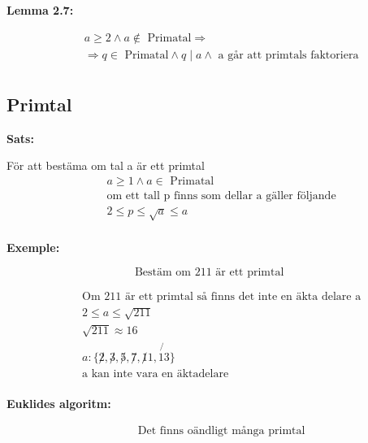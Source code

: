 \documentclass{article}
\begin{document}
\textbf{Lemma 2.7:}\par
\begin{align*}
  &\quad  a \geq 2 \land a \notin \text{ Primatal} \Rightarrow \\
  &\quad  \Rightarrow q \in \text{ Primatal} \land q \mid a \land \text{ a går att primtals faktoriera}\\
\end{align*}


\newpage

\subsection{Primtal}

\textbf{Sats:}\par
För att bestäma om tal a är ett primtal
\begin{align*}
  &\quad  a \geq 1 \land a \in \text{ Primatal} \\
  &\quad  \text{om ett tall p finns som dellar a gäller följande} \\
  &\quad  2 \leq p \leq \sqrt{a} \leq a \\
\end{align*}


\textbf{Exemple:}\par
\begin{equation}
  \text{Bestäm om 211 är ett primtal }
\end{equation}

\begin{align*}
  &\quad  \text{Om 211 är ett primtal så finns det inte en äkta delare a} \\
  &\quad  2 \leq a \leq \sqrt{211}  \\
  &\quad  \sqrt{211} \approx 16 \\
  &\quad  a: \{ \not 2, \not 3, \not 5, \not 7, \not 11, \not{13} \} \\
  &\quad  \text{a kan inte vara en äktadelare} \\
\end{align*}


\textbf{Euklides algoritm:}\par
\begin{align*}
  &\quad  \text{Det finns oändligt många primtal} \\
\end{align*}
\end{document}
